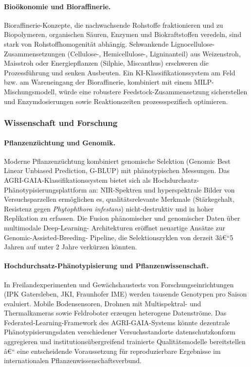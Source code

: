 ﻿\documentclass[12pt,a4paper]{article}
\theoremstyle{plain}
\theoremstyle{definition}
\begin{document}
	\paragraph{Bioökonomie und Bioraffinerie.}
	Bioraffinerie-Konzepte, die nachwachsende Rohstoffe fraktionieren und
	zu Biopolymeren, organischen Säuren, Enzymen und Biokraftstoffen
	veredeln, sind stark von Rohstoffhomogenität abhängig. Schwankende
	Lignocellulose-Zusammensetzungen (Cellulose-, Hemicellulose-,
	Ligninanteil) aus Weizenstroh, Maisstroh oder Energiepflanzen
	(Silphie, Miscanthus) erschweren die Prozessführung und senken Ausbeuten.
	Ein KI-Klassifikationssystem am Feld bzw. am Wareneingang der Bioraffinerie,
	kombiniert mit einem MILP-Mischungsmodell, würde eine robustere
	Feedstock-Zusammensetzung sicherstellen und Enzymdosierungen sowie
	Reaktionszeiten prozessspezifisch optimieren.

	\subsubsection{Wissenschaft und Forschung}

	\paragraph{Pflanzenzüchtung und Genomik.}
	Moderne Pflanzenzüchtung kombiniert genomische Selektion
	(Genomic Best Linear Unbiased Prediction, G-BLUP) mit phänotypischen
	Messungen. Das AGRI-GAIA-Klassifikationssystem bietet sich als
	Hochdurchsatz-Phänotypisierungsplattform an: NIR-Spektren und
	hyperspektrale Bilder von Versuchsparzellen ermöglichen es, qualitätsrelevante
	Merkmale (Stärkegehalt, Resistenz gegen \textit{Phytophthora infestans})
	nicht-destruktiv und in hoher Replikation zu erfassen. Die Fusion
	phänomischer und genomischer Daten über multimodale Deep-Learning-
	Architekturen eröffnet neuartige Ansätze zur Genomic-Assisted-Breeding-
	Pipeline, die Selektionszyklen von derzeit 3â€“5 Jahren auf unter 2 Jahre
	verkürzen könnten.

	\paragraph{Hochdurchsatz-Phänotypisierung und Pflanzenwissenschaft.}
	In Freilandexperimenten und Gewächshaustests von Forschungseinrichtungen
	(IPK Gatersleben, JKI, Fraunhofer IME) werden tausende Genotypen pro
	Saison evaluiert. Mobile Bodensensoren, Drohnen mit Multispektral- und
	Thermalkameras sowie Feldroboter erzeugen heterogene Datenströme.
	Das Federated-Learning-Framework des AGRI-GAIA-Systems könnte dezentrale
	Phänotypisierungsdaten verschiedener Versuchsstandorte datenschutzkonform
	aggregieren und institutionsübergreifend trainierte Qualitätsmodelle
	bereitstellen â€“ eine entscheidende Voraussetzung für reproduzierbare
	Ergebnisse im internationalen Pflanzenwissenschaftsverbund.
\end{document}
